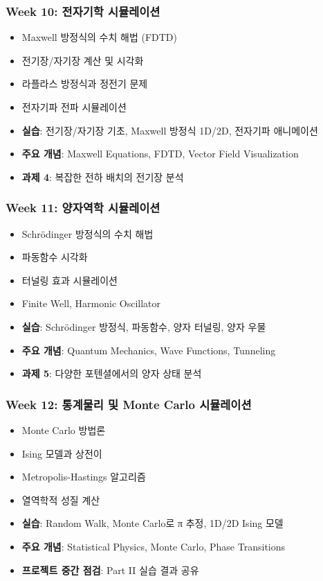 \documentclass[11pt,a4paper]{article}
\begin{document}
\subsubsection*{Week 10: 전자기학 시뮬레이션}
\begin{itemize}[noitemsep]
    \item Maxwell 방정식의 수치 해법 (FDTD)
    \item 전기장/자기장 계산 및 시각화
    \item 라플라스 방정식과 정전기 문제
    \item 전자기파 전파 시뮬레이션
    \item \textbf{실습}: 전기장/자기장 기초, Maxwell 방정식 1D/2D, 전자기파 애니메이션
    \item \textbf{주요 개념}: Maxwell Equations, FDTD, Vector Field Visualization
    \item \textbf{과제 4}: 복잡한 전하 배치의 전기장 분석
\end{itemize}

\subsubsection*{Week 11: 양자역학 시뮬레이션}
\begin{itemize}[noitemsep]
    \item Schrödinger 방정식의 수치 해법
    \item 파동함수 시각화
    \item 터널링 효과 시뮬레이션
    \item Finite Well, Harmonic Oscillator
    \item \textbf{실습}: Schrödinger 방정식, 파동함수, 양자 터널링, 양자 우물
    \item \textbf{주요 개념}: Quantum Mechanics, Wave Functions, Tunneling
    \item \textbf{과제 5}: 다양한 포텐셜에서의 양자 상태 분석
\end{itemize}

\subsubsection*{Week 12: 통계물리 및 Monte Carlo 시뮬레이션}
\begin{itemize}[noitemsep]
    \item Monte Carlo 방법론
    \item Ising 모델과 상전이
    \item Metropolis-Hastings 알고리즘
    \item 열역학적 성질 계산
    \item \textbf{실습}: Random Walk, Monte Carlo로 π 추정, 1D/2D Ising 모델
    \item \textbf{주요 개념}: Statistical Physics, Monte Carlo, Phase Transitions
    \item \textbf{프로젝트 중간 점검}: Part II 실습 결과 공유
\end{itemize}
\end{document}
